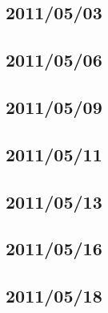 \subsection{2011/05/03}
\subsection{2011/05/06}
\subsection{2011/05/09}
\subsection{2011/05/11}
\subsection{2011/05/13}
\subsection{2011/05/16}
\subsection{2011/05/18}